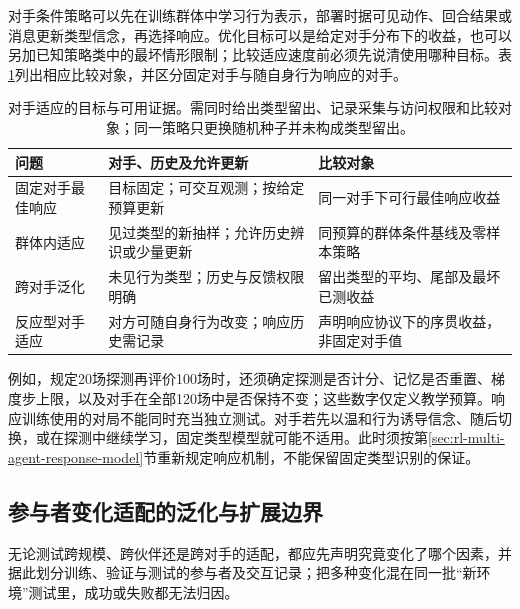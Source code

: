 对手条件策略可以先在训练群体中学习行为表示，部署时据可见动作、回合结果或消息更新类型信念，再选择响应。优化目标可以是给定对手分布下的收益，也可以另加已知策略类中的最坏情形限制；比较适应速度前必须先说清使用哪种目标。表\ref{tab:rl-multi-agent-opponent-adaptation}列出相应比较对象，并区分固定对手与随自身行为响应的对手。

\begin{table}[htbp]
 \centering
 \begin{tabularx}{\linewidth}{@{}l >{\raggedright\arraybackslash}X >{\raggedright\arraybackslash}X@{}}
 \toprule
 问题 & 对手、历史及允许更新 & 比较对象\\
 \midrule
 固定对手最佳响应 & 目标固定；可交互观测；按给定预算更新 & 同一对手下可行最佳响应收益\\
 群体内适应 & 见过类型的新抽样；允许历史辨识或少量更新 & 同预算的群体条件基线及零样本策略\\
 跨对手泛化 & 未见行为类型；历史与反馈权限明确 & 留出类型的平均、尾部及最坏已测收益\\
 反应型对手适应 & 对方可随自身行为改变；响应历史需记录 & 声明响应协议下的序贯收益，非固定对手值\\
 \bottomrule
 \end{tabularx}
 \caption{对手适应的目标与可用证据。需同时给出类型留出、记录采集与访问权限和比较对象；同一策略只更换随机种子并未构成类型留出。}
 \label{tab:rl-multi-agent-opponent-adaptation}
\end{table}

例如，规定20场探测再评价100场时，还须确定探测是否计分、记忆是否重置、梯度步上限，以及对手在全部120场中是否保持不变；这些数字仅定义教学预算。响应训练使用的对局不能同时充当独立测试。对手若先以温和行为诱导信念、随后切换，或在探测中继续学习，固定类型模型就可能不适用。此时须按第\ref{sec:rl-multi-agent-response-model}节重新规定响应机制，不能保留固定类型识别的保证。

\subsection{参与者变化适配的泛化与扩展边界}
\label{sec:rl-multi-agent-generalization}

无论测试跨规模、跨伙伴还是跨对手的适配，都应先声明究竟变化了哪个因素，并据此划分训练、验证与测试的参与者及交互记录；把多种变化混在同一批“新环境”测试里，成功或失败都无法归因。

